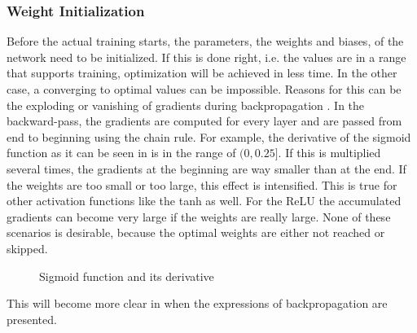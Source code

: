 \subsubsection{Weight Initialization}
\label{sec:training-weight-initialization}
Before the actual training starts, the parameters, the weights and biases, of the network need to be initialized.
If this is done right, i.e. the values are in a range that supports training, optimization will be achieved in less time.
In the other case, a converging to optimal values can be impossible.
Reasons for this can be the exploding or vanishing of gradients during backpropagation \cite{Hochreiter1991}.
In the backward-pass, the gradients are computed for every layer and are passed from end to beginning using the chain rule.
For example, the derivative of the sigmoid function as it can be seen in  is in the range of $(0, 0.25]$.
If this is multiplied several times, the gradients at the beginning are way smaller than at the end.
If the weights are too small or too large, this effect is intensified.
This is true for other activation functions like the tanh as well.
For the ReLU the accumulated gradients can become very large if the weights are really large.
None of these scenarios is desirable, because the optimal weights are either not reached or skipped.
\begin{figure}
	\setlength{}
	\setlength{}
	\centering
	
	\caption{Sigmoid function and its derivative}
	\label{fig:sigmoid-derivative}
\end{figure}
This will become more clear in  when the expressions of backpropagation are presented.

